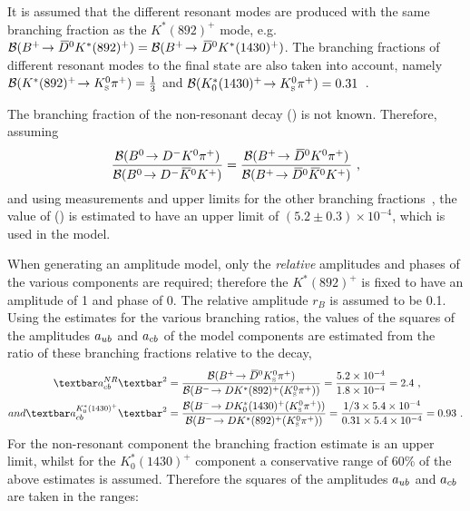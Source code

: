 It is assumed that the different resonant \Kstarp modes are produced with the same branching fraction as the $K^*(892)^+$ mode, e.g. ${\mathcal{B}}({{{B}^+}}\!\rightarrow {\ensuremath{{\kern 0.2em\overline{\kern -0.2em D}{}}{}^0}} K^*(892)^+) = {\mathcal{B}}({{{B}^+}}\!\rightarrow {\ensuremath{{\kern 0.2em\overline{\kern -0.2em D}{}}{}^0}} K^*(1430)^+)$. The branching fractions of different resonant \Kstarp modes to the \KS\pip final state are also taken into account, namely ${\mathcal{B}}(K^*(892)^+\!\rightarrow {\ensuremath{{K}^0_{\mathrm{ \scriptscriptstyle S}}}}{\ensuremath{{\pi}^+}}) = \frac{1}{3}$ and ${\mathcal{B}}(K^*_0(1430)^+\!\rightarrow {\ensuremath{{K}^0_{\mathrm{ \scriptscriptstyle S}}}}{\ensuremath{{\pi}^+}}) = 0.31$~\cite{PDG2016}.

The branching fraction of the non-resonant decay \BR(\decay{\Bp}{\Dzb\KS\pip}) is not known. Therefore, assuming
\begin{equation*}
\frac{{\mathcal{B}}({{B}^0}\!\rightarrow {\ensuremath{{D}^-}}{\ensuremath{{K}^0}}{\ensuremath{{\pi}^+}})}{{\mathcal{B}}({{B}^0}\!\rightarrow {\ensuremath{{D}^-}}{\ensuremath{{\kern 0.2em\overline{\kern -0.2em K}{}}{}^0}}{\ensuremath{{K}^+}})} = \frac{{\mathcal{B}}({{{B}^+}}\!\rightarrow {\ensuremath{{\kern 0.2em\overline{\kern -0.2em D}{}}{}^0}}{\ensuremath{{K}^0}}{\ensuremath{{\pi}^+}})}{{\mathcal{B}}({{{B}^+}}\!\rightarrow {\ensuremath{{\kern 0.2em\overline{\kern -0.2em D}{}}{}^0}}{\ensuremath{{\kern 0.2em\overline{\kern -0.2em K}{}}{}^0}}{\ensuremath{{K}^+}})} \text{ ,}
\end{equation*}
and using measurements and upper limits for the other branching fractions~\cite{PDG2014}, the value of \BR(\decay{\Bp}{\Dzb\KS\pip}) is estimated to have an upper limit of $(5.2 \pm 0.3) \times 10^{-4}$, which is used in the model.

When generating an amplitude model, only the \textit{relative} amplitudes and phases of the various components are required; therefore the $K^*(892)^+$ is fixed to have an amplitude of 1 and phase of 0. The relative amplitude $r_B$ is assumed to be 0.1. Using the estimates for the various branching ratios, the values of the squares of the amplitudes $a_{{u}{b}}$ and $a_{{c}{b}}$ of the model components are estimated from the ratio of these branching fractions relative to the  decay,
\begin{align*}
\textbar a_{\cquark\bquark}^{NR}\textbar^2 &= \frac{\BR(\decay{\Bp}{\Dzb\KS\pip})}{\BR(\decay{\Bm}{\D K^*(892)^+(\KS\pip)})} = \frac{5.2 \times 10^{-4}}{1.8 \times 10^{-4}} = 2.4 \text{ ,} \\
and
\textbar a_{\cquark\bquark}^{K^*_0(1430)^+}\textbar^2 &= \frac{\BR(\decay{\Bm}{\D K^*_0(1430)^+(\KS\pip)})}{\BR(\decay{\Bm}{\D K^*(892)^+(\KS\pip)})} = \frac{1/3 \times 5.4 \times 10^{-4}}{0.31 \times 5.4 \times 10^{-4}} = 0.93 \text{ .}
\end{align*}
For the non-resonant component the branching fraction estimate is an upper limit, whilst for the $K^*_0(1430)^+$  component a conservative range of 60\% of the above estimates is assumed. Therefore the squares of the amplitudes $a_{{u}{b}}$ and $a_{{c}{b}}$ are taken in the ranges:

